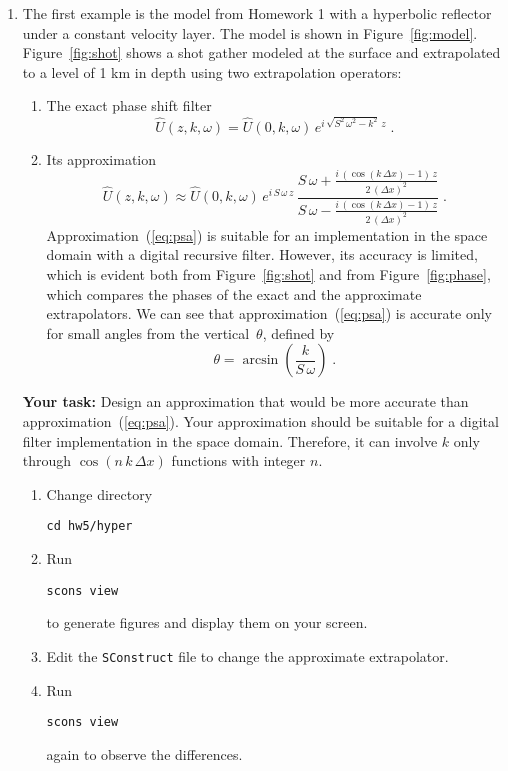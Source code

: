 \begin{enumerate}

\item The first example is the model from Homework 1 with a hyperbolic
  reflector under a constant velocity layer.  The model is shown in
  Figure~\ref{fig:model}. Figure~\ref{fig:shot} shows a shot gather
  modeled at the surface and extrapolated to a level of 1 km in depth
  using two extrapolation operators: 
  \begin{enumerate}
  \item The exact phase shift filter
    \begin{equation}
      \label{eq:ps}
      \hat{U}(z,k,\omega) = \hat{U}(0,k,\omega)\,e^{i\,\sqrt{S^2\,\omega^2 - k^2}\,z}\;.
    \end{equation}
  \item Its approximation
    \begin{equation}
      \label{eq:psa}
      \hat{U}(z,k,\omega) \approx \hat{U}(0,k,\omega)\,
      e^{i\,S\,\omega\,z}\,
      \frac
      {\displaystyle S\,\omega + \frac{i\,\left(\cos{(k\,\Delta x)}-1\right)\,z}{2\,(\Delta x)^2}}
      {\displaystyle S\,\omega - \frac{i\,\left(\cos{(k\,\Delta x)}-1\right)\,z}{2\,(\Delta x)^2}}\;.
    \end{equation}
    Approximation~(\ref{eq:psa}) is suitable for an implementation in the space domain
    with a digital recursive filter. However, its accuracy is limited,
    which is evident both from Figure~\ref{fig:shot} and from
    Figure~\ref{fig:phase}, which compares the phases of the exact and
    the approximate extrapolators. We can see that
    approximation~(\ref{eq:psa}) is accurate only for small angles
    from the vertical~$\theta$, defined by 
\[
\theta = \arcsin\left(\frac{k}{S\,\omega}\right)\;.
\] 
  \end{enumerate}

  \textbf{Your task:} Design an approximation that would be more accurate
    than approximation~(\ref{eq:psa}). Your approximation should be
    suitable for a digital filter implementation in the space
    domain. Therefore, it can involve $k$ only through $\cos{(n\,k\,\Delta
      x)}$ functions with integer $n$.
    \begin{enumerate}
    \item Change directory 
\begin{verbatim}
cd hw5/hyper
\end{verbatim}
    \item Run
\begin{verbatim}
scons view
\end{verbatim}
      to generate figures and display them on your screen.  
    \item Edit the \texttt{SConstruct} file to change the approximate extrapolator.
    \item Run
\begin{verbatim}
scons view
\end{verbatim}
      again to observe the differences.
    \end{enumerate}


\end{enumerate}
